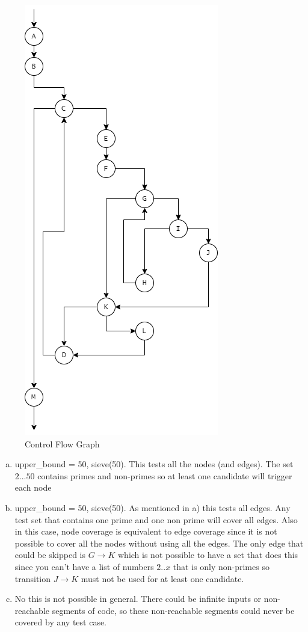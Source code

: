 \documentclass[11pt]{article}
\begin{document}
\begin{figure}[H]
    \centering
    \includegraphics[scale = 0.5]{./CFG_Prob2.png}
    \caption{Control Flow Graph}
    \label{fig:cfg}
\end{figure}

\begin{enumerate}[a)]
	\item upper\_bound = 50, sieve(50). This tests all the nodes (and edges). The set $2... 50$ contains primes and non-primes so at least one candidate will trigger each node
	
	\item upper\_bound = 50, sieve(50). As mentioned in a) this tests all edges. Any test set that contains one prime and one non prime will cover all edges. Also in this case, node coverage is equivalent to edge coverage since it is not possible to cover all the nodes without using all the edges. The only edge that could be skipped is $G \rightarrow K$ which is not possible to have a set that does this since you can't have a list of numbers $2..x$ that is only non-primes so transition $J \rightarrow K$ must not be used for at least one candidate.
	
	\item No this is not possible in general. There could be infinite inputs or non-reachable segments of code, so these non-reachable segments could never be covered by any test case. 
	

\end{enumerate}
\end{document}
